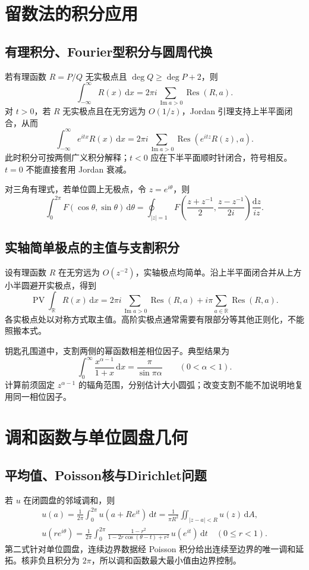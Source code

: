 \documentclass[../main.tex]{subfiles}
\begin{document}
\section{留数法的积分应用}
\subsection{有理积分、Fourier型积分与圆周代换}
若有理函数 $R=P/Q$ 无实极点且 $\deg Q\ge\deg P+2$，则
\[
\int_{-\infty}^{\infty}R(x)\,\mathrm dx
=2\pi i\sum_{\operatorname{Im}a>0}\operatorname{Res}(R,a).
\]
对 $t>0$，若 $R$ 无实极点且在无穷远为 $O(1/z)$，Jordan 引理支持上半平面闭合，从而
\[
\int_{-\infty}^{\infty}e^{itx}R(x)\,\mathrm dx
=2\pi i\sum_{\operatorname{Im}a>0}\operatorname{Res}(e^{itz}R(z),a).
\]
此时积分可按两侧广义积分解释；$t<0$ 应在下半平面顺时针闭合，符号相反。$t=0$ 不能直接套用 Jordan 衰减。

对三角有理式，若单位圆上无极点，令 $z=e^{i\theta}$，则
\[
\int_0^{2\pi}F(\cos\theta,\sin\theta)\,\mathrm d\theta
=\oint_{|z|=1}F\!\left(\frac{z+z^{-1}}2,\frac{z-z^{-1}}{2i}\right)\frac{\mathrm dz}{iz}.
\]

\subsection{实轴简单极点的主值与支割积分}
设有理函数 $R$ 在无穷远为 $O(z^{-2})$，实轴极点均简单。沿上半平面闭合并从上方小半圆避开实极点，得到
\[
\operatorname{PV}\int_{\mathbb R}R(x)\,\mathrm dx
=2\pi i\sum_{\operatorname{Im}a>0}\operatorname{Res}(R,a)
+i\pi\sum_{a\in\mathbb R}\operatorname{Res}(R,a).
\]
各实极点处以对称方式取主值。高阶实极点通常需要有限部分等其他正则化，不能照搬本式。

钥匙孔围道中，支割两侧的幂函数相差相位因子。典型结果为
\[
\int_0^\infty\frac{x^{\alpha-1}}{1+x}\,\mathrm dx
=\frac\pi{\sin\pi\alpha}\qquad(0<\alpha<1).
\]
计算前须固定 $z^{\alpha-1}$ 的辐角范围，分别估计大小圆弧；改变支割不能不加说明地复用同一相位因子。

\section{调和函数与单位圆盘几何}
\subsection{平均值、Poisson核与Dirichlet问题}
若 $u$ 在闭圆盘的邻域调和，则
\begin{gather*}
u(a)=\frac1{2\pi}\int_0^{2\pi}u(a+Re^{it})\,\mathrm dt
=\frac1{\pi R^2}\iint_{|z-a|<R}u(z)\,\mathrm dA,\\
u(re^{i\theta})=\frac1{2\pi}\int_0^{2\pi}
\frac{1-r^2}{1-2r\cos(\theta-t)+r^2}\,u(e^{it})\,\mathrm dt\quad(0\le r<1).
\end{gather*}
第二式针对单位圆盘，连续边界数据经 Poisson 积分给出连续至边界的唯一调和延拓。核非负且积分为 $2\pi$，所以调和函数最大最小值由边界控制。
\end{document}
